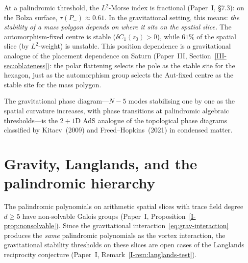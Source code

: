 At a palindromic threshold, the $L^2$-Morse index is
fractional (Paper~I, \S7.3): on the Bolza surface,
$\tau(P_-) \approx 0.61$.
In the gravitational setting, this means:
\emph{the stability of a mass polygon depends on where it
sits on the spatial slice.}
The automorphism-fixed centre is stable
($\delta C_1(z_0) > 0$), while $61\%$ of the spatial slice
(by $L^2$-weight) is unstable.
This position dependence is a gravitational analogue of the
placement dependence on Saturn
(Paper~III, Section~\ref{III-sec:oblateness}): the polar
flattening selects the pole as the stable site for the
hexagon, just as the automorphism group selects the
Aut-fixed centre as the stable site for the mass polygon.

The gravitational phase diagram---$N{-}5$ modes stabilising
one by one as the spatial curvature increases, with
phase transitions at palindromic algebraic thresholds---is
the $2{+}1$D AdS analogue of the topological phase diagrams
classified by Kitaev~(2009) and Freed--Hopkins~(2021) in
condensed matter.

\section{Gravity, Langlands, and the palindromic hierarchy}

The palindromic polynomials on arithmetic spatial slices
with trace field degree $d \ge 5$ have non-solvable Galois
groups (Paper~I, Proposition~\ref{I-prop:nonsolvable}).
Since the gravitational interaction~\eqref{eq:grav-interaction}
produces the \emph{same} palindromic polynomials as the vortex
interaction, the gravitational stability thresholds on these
slices are open cases of the Langlands reciprocity conjecture
(Paper~I, Remark~\ref{I-rem:langlands-test}).

